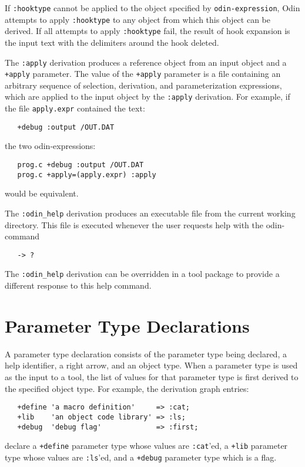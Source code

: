 \documentclass[hidelinks]{report}
\newcommand{\ex}{\tt}   %
\begin{document}
If {\ex :hooktype} cannot be applied to the object specified by 
{\ex odin-expression},
Odin attempts to apply {\ex :hooktype} to any object
from which this object can be derived.
If all attempts to apply {\ex :hooktype} fail, the result of hook
expansion is the input text with the delimiters around the hook deleted.

The {\ex :apply} derivation produces a reference object
from an input object and a {\ex +apply} parameter.
The value of the {\ex +apply} parameter is a file containing
an arbitrary sequence of selection, derivation, and parameterization
expressions, which are applied to the input object by the
{\ex :apply} derivation.  For example, if the file {\ex apply.expr}
contained the text:
\begin{verbatim}
   +debug :output /OUT.DAT
\end{verbatim}
the two odin-expressions:
\begin{verbatim}
   prog.c +debug :output /OUT.DAT
   prog.c +apply=(apply.expr) :apply
\end{verbatim}
would be equivalent.

The {\ex :odin\_help} derivation produces an executable file
from the current working directory.
This file is executed whenever the user requests help with the odin-command
\begin{verbatim}
   -> ?
\end{verbatim}
The {\ex :odin\_help} derivation can be overridden in a tool package
to provide a different response to this help command.


\section{Parameter Type Declarations}
\label{parametertype}

A parameter type declaration consists of
the parameter type being declared,
a help identifier, a right arrow, and an object type.
When a parameter type is used as the input to a tool,
the list of values for that parameter type
is first derived to the specified object type.
For example, the derivation graph entries:
\begin{verbatim}
   +define 'a macro definition'     => :cat;
   +lib    'an object code library' => :ls;
   +debug  'debug flag'             => :first;
\end{verbatim}
declare a {\ex +define} parameter type whose values are {\ex :cat}'ed,
a {\ex +lib} parameter type whose values are {\ex :ls}'ed,
and a {\ex +debug} parameter type which is a flag.
\end{document}
